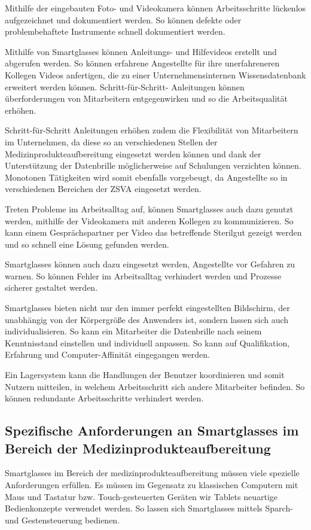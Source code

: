 Mithilfe der eingebauten Foto- und Videokamera können Arbeitsschritte lückenlos aufgezeichnet und dokumentiert werden. So können defekte oder problembehaftete Instrumente schnell dokumentiert werden.

Mithilfe von Smartglasses können Anleitungs- und Hilfevideos erstellt und abgerufen werden. So können erfahrene Angestellte für ihre unerfahreneren Kollegen Videos anfertigen, die zu einer Unternehmensinternen Wissensdatenbank erweitert werden können. Schritt-für-Schritt- Anleitungen können überforderungen von Mitarbeitern entgegenwirken und so die Arbeitsqualität erhöhen.

Schritt-für-Schritt Anleitungen erhöhen zudem die Flexibilität von Mitarbeitern im Unternehmen, da diese so an verschiedenen Stellen der Medizinprodukteaufbereitung eingesetzt werden können und dank der Unterstützung der Datenbrille möglicherweise auf Schulungen verzichten können. Monotonen Tätigkeiten wird somit ebenfalls vorgebeugt, da Angestellte so in verschiedenen Bereichen der ZSVA eingesetzt werden.

Treten Probleme im Arbeitsalltag auf, können Smartglasses auch dazu genutzt werden, mithilfe der Videokamera mit anderen Kollegen zu kommunizieren. So kann einem Gesprächspartner per Video das betreffende Sterilgut gezeigt werden und so schnell eine Lösung gefunden werden.

Smartglasses können auch dazu eingesetzt werden, Angestellte vor Gefahren zu warnen. So können Fehler im Arbeitsalltag verhindert werden und Prozesse sicherer gestaltet werden.

Smartglasses bieten nicht nur den immer perfekt eingestellten Bildschirm, der unabhängig von der Körpergröße des Anwenders ist, sondern lassen sich auch individualisieren. So kann ein Mitarbeiter die Datenbrille nach seinem Kenntnisstand einstellen und individuell anpassen. So kann auf Qualifikation, Erfahrung und Computer-Affinität eingegangen werden.

Ein Lagersystem kann die Handlungen der Benutzer koordinieren und somit Nutzern mitteilen, in welchem Arbeitsschritt sich andere Mitarbeiter befinden. So können redundante Arbeitsschritte verhindert werden. 
%
%
\subsection{Spezifische Anforderungen an Smartglasses im Bereich der Medizinprodukteaufbereitung}
Smartglasses im Bereich der medizinprodukteaufbereitung müssen viele spezielle Anforderungen erfüllen. Es müssen im Gegensatz zu klassischen Computern mit Maus und Tastatur bzw. Touch-gesteuerten Geräten wir Tablets neuartige Bedienkonzepte verwendet werden. So lassen sich Smartglasses mittels Sparch- und Gestensteuerung bedienen.

